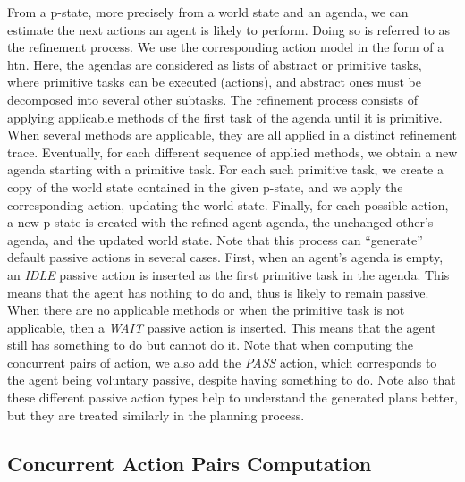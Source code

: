From a p-state, more precisely from a world state and an agenda, we can estimate the next actions an agent is likely to perform. Doing so is referred to as the refinement process. We use the corresponding action model in the form of a \acrfull{htn}. Here, the agendas are considered as lists of abstract or primitive tasks, where primitive tasks can be executed (actions), and abstract ones must be decomposed into several other subtasks. 
The refinement process consists of applying applicable methods of the first task of the agenda until it is primitive. When several methods are applicable, they are all applied in a distinct refinement trace.
Eventually, for each different sequence of applied methods, we obtain a new agenda starting with a primitive task. For each such primitive task, we create a copy of the world state contained in the given p-state, and we apply the corresponding action, updating the world state. 
Finally, for each possible action, a new p-state is created with the refined agent agenda, the unchanged other's agenda, and the updated world state. 
Note that this process can ``generate'' default passive actions in several cases. First, when an agent's agenda is empty, an \textit{IDLE} passive action is inserted as the first primitive task in the agenda. This means that the agent has nothing to do and, thus is likely to remain passive. When there are no applicable methods or when the primitive task is not applicable, then a \textit{WAIT} passive action is inserted. This means that the agent still has something to do but cannot do it. Note that when computing the concurrent pairs of action, we also add the \textit{PASS} action, which corresponds to the agent being voluntary passive, despite having something to do. Note also that these different passive action types help to understand the generated plans better, but they are treated similarly in the planning process.

    \subsection{Concurrent Action Pairs Computation}

